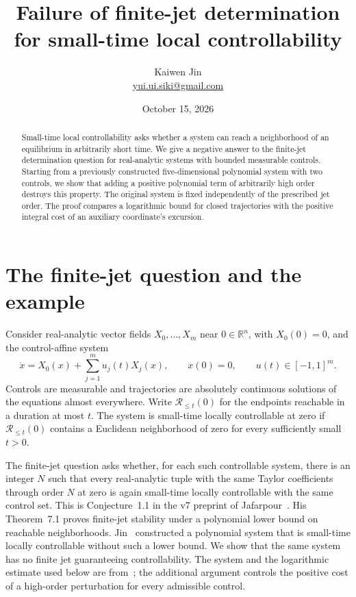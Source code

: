 \documentclass[11pt,a4paper]{article}
\title{Failure of finite-jet determination for small-time local controllability}
\author{Kaiwen Jin\\\small\href{mailto:yui.ui.siki@gmail.com}{yui.ui.siki@gmail.com}}
\date{October 15, 2026}
\newcommand{\R}{\mathbb{R}}
\newcommand{\Reach}{\mathcal{R}}
\begin{document}
\maketitle

\begin{abstract}
Small-time local controllability asks whether a system can reach a
neighborhood of an equilibrium in arbitrarily short time.
We give a negative answer to the finite-jet determination question for
real-analytic systems with bounded measurable controls.
Starting from a previously constructed five-dimensional polynomial system
with two controls, we show that adding a positive polynomial term of
arbitrarily high order destroys this property.
The original system is fixed independently of the prescribed jet order.
The proof compares a logarithmic bound for closed trajectories with the
positive integral cost of an auxiliary coordinate's excursion.
\end{abstract}

\section{The finite-jet question and the example}

Consider real-analytic vector fields $X_0,\ldots,X_m$ near $0\in\R^n$,
with $X_0(0)=0$, and the control-affine system
\[
 \dot x=X_0(x)+\sum_{j=1}^m u_j(t)X_j(x),\qquad x(0)=0,
 \qquad u(t)\in[-1,1]^m.
\]
Controls are measurable and trajectories are absolutely continuous
solutions of the equations almost everywhere.
Write $\Reach_{\le t}(0)$ for the endpoints reachable in a duration at most
$t$. The system is small-time locally controllable at zero if
$\Reach_{\le t}(0)$ contains a Euclidean neighborhood of zero for every
sufficiently small $t>0$.

The finite-jet question asks whether, for each such controllable system,
there is an integer $N$ such that every real-analytic tuple with the same
Taylor coefficients through order $N$ at zero is again small-time locally
controllable with the same control set.
This is Conjecture~1.1 in the v7 preprint of Jafarpour~\cite{Jafarpour}.
His Theorem~7.1 proves finite-jet stability under a polynomial lower bound
on reachable neighborhoods.
Jin~\cite{Jin} constructed a polynomial system that is small-time locally
controllable without such a lower bound.
We show that the same system has no finite jet guaranteeing controllability.
The system and the logarithmic estimate used below are from~\cite{Jin};
the additional argument controls the positive cost of a high-order
perturbation for every admissible control.
\end{document}
